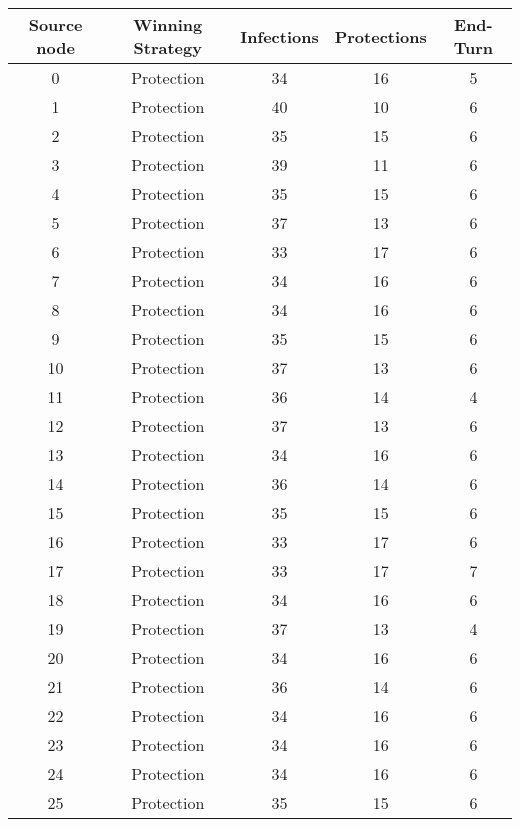 \documentclass[results.tex]{subfiles}
\begin{document}
\begin{center}
  \begin{tabular}{| c || c | c | c | c |}
    \hline
    {\bfseries Source node} & {\bfseries Winning Strategy} & {\bfseries Infections} & {\bfseries Protections} & {\bfseries End-Turn} \\  %
    \hline\hline
    0 & Protection & 34 & 16 & 5 \\ 
    \hline
    1 & Protection & 40 & 10 & 6 \\ 
    \hline
    2 & Protection & 35 & 15 & 6 \\ 
    \hline
    3 & Protection & 39 & 11 & 6 \\ 
    \hline
    4 & Protection & 35 & 15 & 6 \\ 
    \hline
    5 & Protection & 37 & 13 & 6 \\ 
    \hline
    6 & Protection & 33 & 17 & 6 \\ 
    \hline
    7 & Protection & 34 & 16 & 6 \\ 
    \hline
    8 & Protection & 34 & 16 & 6 \\ 
    \hline
    9 & Protection & 35 & 15 & 6 \\ 
    \hline
    10 & Protection & 37 & 13 & 6 \\ 
    \hline
    11 & Protection & 36 & 14 & 4 \\ 
    \hline
    12 & Protection & 37 & 13 & 6 \\ 
    \hline
    13 & Protection & 34 & 16 & 6 \\ 
    \hline
    14 & Protection & 36 & 14 & 6 \\ 
    \hline
    15 & Protection & 35 & 15 & 6 \\ 
    \hline
    16 & Protection & 33 & 17 & 6 \\ 
    \hline
    17 & Protection & 33 & 17 & 7 \\ 
    \hline
    18 & Protection & 34 & 16 & 6 \\ 
    \hline
    19 & Protection & 37 & 13 & 4 \\ 
    \hline
    20 & Protection & 34 & 16 & 6 \\ 
    \hline
    21 & Protection & 36 & 14 & 6 \\ 
    \hline
    22 & Protection & 34 & 16 & 6 \\ 
    \hline
    23 & Protection & 34 & 16 & 6 \\ 
    \hline
    24 & Protection & 34 & 16 & 6 \\ 
    \hline
    25 & Protection & 35 & 15 & 6 \\ 

\end{tabular}
\end{center}
\end{document}
